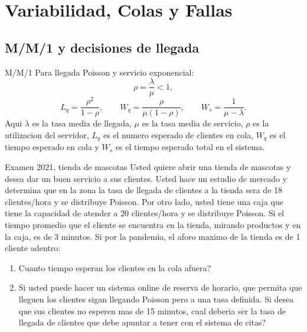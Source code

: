 \section{Variabilidad, Colas y Fallas}

\subsection{M/M/1 y decisiones de llegada}

\begin{materia}{M/M/1}
Para llegada Poisson y servicio exponencial:
\[
  \rho=\frac{\lambda}{\mu}<1,
\]
\[
  L_q=\frac{\rho^2}{1-\rho},\qquad
  W_q=\frac{\rho}{\mu(1-\rho)},\qquad
  W_s=\frac{1}{\mu-\lambda}.
\]
Aqui $\lambda$ es la tasa media de llegada, $\mu$ es la tasa media de servicio, $\rho$ es la utilizacion del servidor, $L_q$ es el numero esperado de clientes en cola, $W_q$ es el tiempo esperado en cola y $W_s$ es el tiempo esperado total en el sistema.
\end{materia}

\begin{enunciado}{Examen 2021, tienda de mascotas}
Usted quiere abrir una tienda de mascotas y desea dar un buen servicio a sus clientes. Usted hace un estudio de mercado y determina que en la zona la tasa de llegada de clientes a la tienda sera de 18 clientes/hora y se distribuye Poisson. Por otro lado, usted tiene una caja que tiene la capacidad de atender a 20 clientes/hora y se distribuye Poisson. Si el tiempo promedio que el cliente se encuentra en la tienda, mirando productos y en la caja, es de 3 minutos. Si por la pandemia, el aforo maximo de la tienda es de 1 cliente adentro:

\begin{enumerate}[label=\alph*)]
  \item Cuanto tiempo esperan los clientes en la cola afuera?
  \item Si usted puede hacer un sistema online de reserva de horario, que permita que lleguen los clientes sigan llegando Poisson pero a una tasa definida. Si desea que sus clientes no esperen mas de 15 minutos, cual deberia ser la tasa de llegada de clientes que debe apuntar a tener con el sistema de citas?
\end{enumerate}
\end{enunciado}

